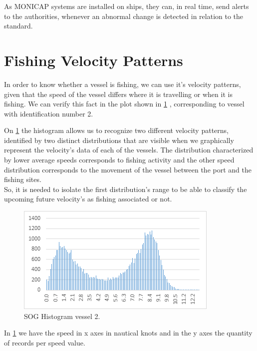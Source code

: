 As MONICAP systems are installed on ships, they can, in real time, send alerts to the authorities, whenever an abnormal change is detected in relation to the standard.


\section{Fishing Velocity Patterns} %
\label{sub:fishing_velocity_patterns}
In order to know whether a vessel is fishing, we can use it’s velocity patterns, given that the speed of the vessel differs where it is travelling or when it is fishing. We can verify this fact in the plot shown in \ref{fig:histogram_vessel2} , corresponding to vessel with identification number 2.

On \ref{fig:histogram_vessel2} the histogram allows us to recognize two different velocity patterns, identified by two distinct distributions that are visible when we graphically represent the velocity’s data of each of the vessels. The distribution characterized by lower average speeds corresponds to fishing activity and the other speed distribution corresponds to the movement of the vessel between the port and the fishing sites.\\
So, it is needed to isolate the first distribution’s range to be able to classify the upcoming future velocity’s as fishing associated or not.
 
\begin{figure}[H]
    \centering
    \includegraphics[width=0.8\linewidth]{Chapters/img/hist_vessel2.png}
    \caption{SOG Histogram vessel 2.}
    \label{fig:histogram_vessel2}
\end{figure}

In \ref{fig:histogram_vessel2} we have the speed in x axes in nautical knots and in the y axes the quantity of records per speed value.


